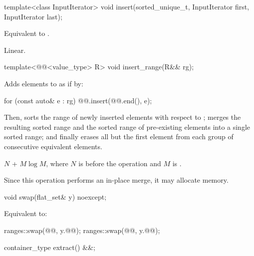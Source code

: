 %
\begin{itemdecl}
template<class InputIterator>
  void insert(sorted_unique_t, InputIterator first, InputIterator last);
\end{itemdecl}

\begin{itemdescr}
\pnum
\effects
Equivalent to .

\pnum
\complexity
Linear.
\end{itemdescr}

%
\begin{itemdecl}
template<@@<value_type> R>
  void insert_range(R&& rg);
\end{itemdecl}

\begin{itemdescr}
\pnum
\effects
Adds elements to  as if by:
\begin{codeblock}
for (const auto& e : rg) {
  @@.insert(@@.end(), e);
}
\end{codeblock}
Then,
sorts the range of newly inserted elements with respect to ;
merges the resulting sorted range and
the sorted range of pre-existing elements into a single sorted range; and
finally erases all but the first element
from each group of consecutive equivalent elements.

\pnum
\complexity
$N$ + $M \log M$, where $N$ is  before the operation and $M$
is .

\pnum
\remarks
Since this operation performs an in-place merge, it may allocate memory.
\end{itemdescr}

%
\begin{itemdecl}
void swap(flat_set& y) noexcept;
\end{itemdecl}

\begin{itemdescr}
\pnum
\effects
Equivalent to:
\begin{codeblock}
ranges::swap(@@, y.@@);
ranges::swap(@@, y.@@);
\end{codeblock}
\end{itemdescr}

%
\begin{itemdecl}
container_type extract() &&;
\end{itemdecl}

